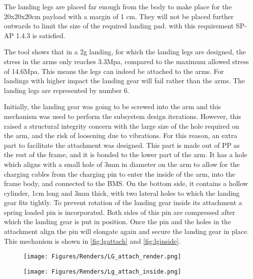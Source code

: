 The landing legs are placed far enough from the body to make place for the 20x20x20cm payload with a margin of 1 cm. They will not be placed further outwards to limit the size of the required landing pad. with this requirement SP-AP 1.4.3 is satisfied.

The tool shows that in a 2g landing, for which the landing legs are designed, the stress in the arms only reaches 3.3Mpa, compared to the maximum allowed stress of 14.6Mpa. This means the legs can indeed be attached to the arms. For landings with higher impact the landing gear will fail rather than the arms. The landing legs are represented by number 6.

Initially, the landing gear was going to be screwed into the arm and this mechanism was used to perform the subsystem design iterations. However, this raised a structural integrity concern with the large size of the hole required on the arm, and the risk of loosening due to vibrations. For this reason, an extra part to facilitate the attachment was designed. This part is made out of PP as the rest of the frame, and it is bonded to the lower part of the arm. It has a hole which aligns with a small hole of 3mm in diameter on the arm to allow for the charging cables from the charging pin to enter the inside of the arm, into the frame body, and connected to the BMS. On the bottom side, it contains a hollow cylinder, 1cm long and 3mm thick, with two lateral holes to which the landing gear fits tightly. To prevent rotation of the landing gear inside its attachment a spring loaded pin is incorporated. Both sides of this pin are compressed after which the landing gear is put in position. Once the pin and the holes in the attachment align the pin will elongate again and secure the landing gear in place. This mechanism is shown in \autoref{fig:lgattach} and \autoref{fig:lginside}. 

\begin{figure}[h]
\centering
\begin{minipage}{.5\textwidth}
  \centering
  \texttt{[image: Figures/Renders/LG\_attach\_render.png]}
  \label{fig:lgattach}
\end{minipage}%
\begin{minipage}{.5\textwidth}
  \centering
  \texttt{[image: Figures/Renders/Lg\_attach\_inside.png]}
  \label{fig:lginside}
\end{minipage}
\end{figure}

